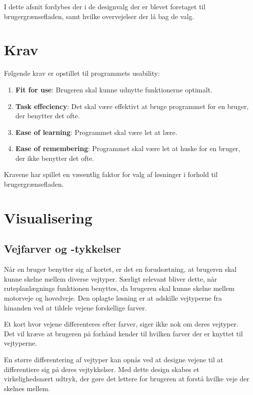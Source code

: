 I dette afsnit fordybes der i de designvalg der er blevet foretaget til brugergrænsefladen, samt hvilke overvejelser der lå bag de valg.

\section{Krav}

Følgende krav er opstillet til programmets usability:

\begin{enumerate}
	\item \textbf{Fit for use}: Brugeren skal kunne udnytte funktionerne optimalt. 
	\item \textbf{Task effeciency}: Det skal være effektivt at bruge programmet for en bruger, der benytter det ofte. 
	\item \textbf{Ease of learning}: Programmet skal være let at lære.
	\item \textbf{Ease of remembering}:  Programmet skal være let at huske for en bruger, der ikke benytter det ofte. 
\end{enumerate}

Kravene har spillet en væsentlig faktor for valg af løsninger i forhold til brugergrænsefladen. 

\section{Visualisering}

\subsection{Vejfarver og -tykkelser}

Når en bruger benytter sig af kortet, er det en forudsætning, at brugeren skal kunne skelne mellem diverse vejtyper. Særligt relevant bliver dette, når ruteplanlægnings funktionen benyttes, da brugeren skal kunne skelne mellem motorveje og hovedveje. Den oplagte løsning er at adskille vejtyperne fra hinanden ved at tildele vejene forskellige farver. 

Et kort hvor vejene differenteres efter farver, siger ikke nok om deres vejtyper. Det vil kræve at brugeren på forhånd kender til hvilken farver der er knyttet til vejtyperne. 

En større differentering af vejtyper kan opnås ved at designe vejene til at differentiere sig på deres vejtykkelser. Med dette design skabes et virkelighedsnært udtryk, der gøre det lettere for brugeren at forstå hvilke veje der skelnes mellem.  


